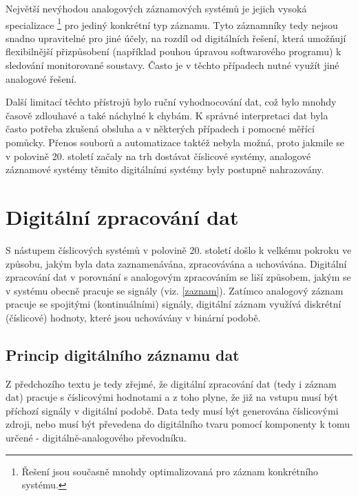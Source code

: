 Největší nevýhodou analogových záznamových systémů je jejich vysoká specializace \footnote{Řešení jsou současně mnohdy optimalizovaná pro záznam konkrétního systému.} pro jediný konkrétní typ záznamu. Tyto záznamníky tedy nejsou snadno upravitelné pro jiné účely, na rozdíl od digitálních řešení, která umožňují flexibilnější přizpůsobení (například pouhou úpravou softwarového programu) k sledování monitorované soustavy. Často je v těchto případech nutné využít jiné analogové řešení. \cite{analog_signal_and_digital_signal_processing_Tel_System}

Další limitací těchto přístrojů bylo ruční vyhodnocování dat, což bylo mnohdy časově zdlouhavé a také náchylné k chybám. K správné interpretaci dat byla často potřeba zkušená obsluha a v některých případech i pomocné měřící pomůcky. Přenos souborů a automatizace taktéž nebyla možná, proto jakmile se v polovině 20. století začaly na trh dostávat číslicové systémy, analogové záznamové systémy těmito digitálními systémy byly postupně nahrazovány. \cite{newcastle_history_of_digital_computers, florian_prechod_a_analog_do_digital}


\section{Digitální zpracování dat}
\label{digitalni_zaznam_dat}
S nástupem číslicových systémů v polovině 20. století došlo k velkému pokroku ve způsobu, jakým byla data zaznamenávána, zpracovávána a uchovávána. Digitální zpracování dat v porovnání s analogovým zpracováním se liší způsobem, jakým se v systému obecně pracuje se signály (viz. \ref{zaznam}). Zatímco analogový záznam pracuje se spojitými (kontinuálními) signály, digitální záznam využívá diskrétní (číslicové) hodnoty, které jsou uchovávány v binární podobě.

\subsection{Princip digitálního záznamu dat}
Z předchozího textu je tedy zřejmé, že digitální zpracování dat (tedy i záznam dat) pracuje s číslicovými hodnotami a z toho plyne, že již na vstupu musí být příchozí signály v digitální podobě. Data tedy musí být generována číslicovými zdroji, nebo musí být převedena do digitálního tvaru pomocí komponenty k tomu určené - digitálně-analogového převodníku. 

